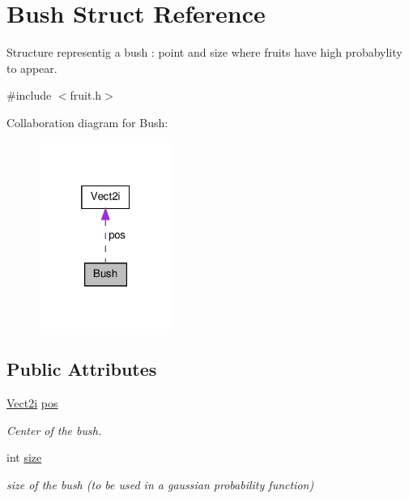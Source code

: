 \hypertarget{struct_bush}{\section{Bush Struct Reference}
\label{struct_bush}
}


Structure representig a bush \-: point and size where fruits have high probabylity to appear.  




{\ttfamily \#include $<$fruit.\-h$>$}



Collaboration diagram for Bush\-:
\nopagebreak
\begin{figure}[H]
\begin{center}
\leavevmode
\includegraphics[width=124pt]{struct_bush__coll__graph}
\end{center}
\end{figure}
\subsection*{Public Attributes}
\begin{DoxyCompactItemize}
\item 
\hyperlink{struct_vect2i}{Vect2i} \hyperlink{struct_bush_ab3135be5ff260f0e223cb9c64f4aedc3}{pos}
\begin{DoxyCompactList}\small\item\em Center of the bush. \end{DoxyCompactList}\item 
int \hyperlink{struct_bush_a3b40c2cda3c709539246d302e74b8168}{size}
\begin{DoxyCompactList}\small\item\em size of the bush (to be used in a gaussian probability function) \end{DoxyCompactList}\end{DoxyCompactItemize}


